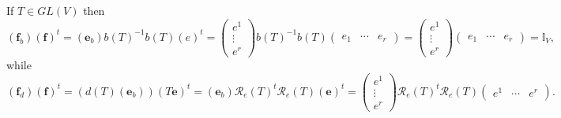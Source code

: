 \documentclass[aps,preprint]{revtex4}
\begin{document}
If $T\in GL\left( V\right) $ then 
\begin{equation}
\left( \boldsymbol{f}_{b}\right) \left( \boldsymbol{f}\right) ^{t}=\left( 
\boldsymbol{e}_{b}\right) b\left( T\right) ^{-1}b\left( T\right) \left(
e\right) ^{t}=\left( 
\begin{array}{c}
e^{1} \\ 
\vdots \\ 
e^{r}%
\end{array}%
\right) b\left( T\right) ^{-1}b\left( T\right) \left( 
\begin{array}{ccc}
e_{1} & \cdots & e_{r}%
\end{array}%
\right) =\left( 
\begin{array}{c}
e^{1} \\ 
\vdots \\ 
e^{r}%
\end{array}%
\right) \left( 
\begin{array}{ccc}
e_{1} & \cdots & e_{r}%
\end{array}%
\right) =\mathbb{I}_{V},
\end{equation}%
while%
\begin{equation}
\left( \boldsymbol{f}_{d}\right) \left( \boldsymbol{f}\right) ^{t}=\left(
d\left( T\right) \left( \boldsymbol{e}_{b}\right) \right) \left( T%
\boldsymbol{e}\right) ^{t}=\left( \boldsymbol{e}_{b}\right) \mathcal{R}%
_{e}\left( T\right) ^{t}\mathcal{R}_{e}\left( T\right) \left( \boldsymbol{e}%
\right) ^{t}=\left( 
\begin{array}{c}
e^{1} \\ 
\vdots \\ 
e^{r}%
\end{array}%
\right) \mathcal{R}_{e}\left( T\right) ^{t}\mathcal{R}_{e}\left( T\right)
\left( 
\begin{array}{ccc}
e^{1} & \cdots & e^{r}%
\end{array}%
\right) .
\end{equation}

\label{Definbiion of Covariant and Contrariant vectors}
\end{document}
